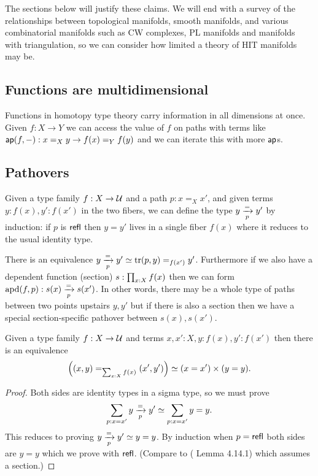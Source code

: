 \documentclass[12pt]{article}
\begin{document}
The sections below will justify these claims. We will end with a survey of the relationships between topological manifolds, smooth manifolds, and various combinatorial manifolds such as CW complexes, PL manifolds and manifolds with triangulation, so we can consider how limited a theory of HIT manifolds may be.

\subsection{Functions are multidimensional}

Functions in homotopy type theory carry information in all dimensions at once. Given \( f:X\to Y \) we can access the value of \( f \) on paths with terms like \( \textsf{ap}(f,-):x=_Xy\to f(x)=_Y f(y) \) and we can iterate this with more \( \textsf{ap} \)s. 

\subsection{Pathovers}
Given a type family \( f:X\to \mathcal{U} \) and a path \( p:x=_X x' \), and given terms \( y:f(x), y':f(x') \) in the two fibers, we can define the type \( y\xrightarrow[{p}]{=}y' \) by induction: if \( p \) is \( \textsf{refl} \) then \( y=y' \) lives in a single fiber \( f(x) \) where it reduces to the usual identity type.

There is an equivalence \( y\xrightarrow[{p}]{=}y'\simeq \mathrm{tr}(p,y)=_{f(x')}y' \). Furthermore if we also have a dependent function (section) \( s:\prod_{x:X} f(x) \) then we can form \( \mathrm{apd}(f,p):s(x)\xrightarrow[{p}]{=}s(x') \). In other words, there may be a whole type of paths between two points upstairs \( y, y' \) but if there is also a section then we have a special section-specific pathover between \( s(x), s(x') \).

\begin{mylemma}
Given a type family \( f:X\to\mathcal{U} \) and terms \( x,x':X, y:f(x), y':f(x') \) then there is an equivalence 
\[ 
  \left((x,y) =_{\sum_{x:X}f(x)} (x',y')\right) \simeq 
  (x=x')\times (y=y).
\]
\end{mylemma}
\begin{proof}
Both sides are identity types in a sigma type, so we must prove
\[ 
\sum_{p:x=x'}y\xrightarrow[{p}]{=}y' \simeq \sum_{p:x=x'}y=y.
\] 
This reduces to proving \( y\xrightarrow[{p}]{=}y'\simeq y=y  \). By induction when \( p=\textsf{refl} \) both sides are \( y=y \) which we prove with \( \textsf{refl} \). (Compare to (\cite{Symmetry} Lemma 4.14.1) which assumes a section.)
\end{proof}
\end{document}
